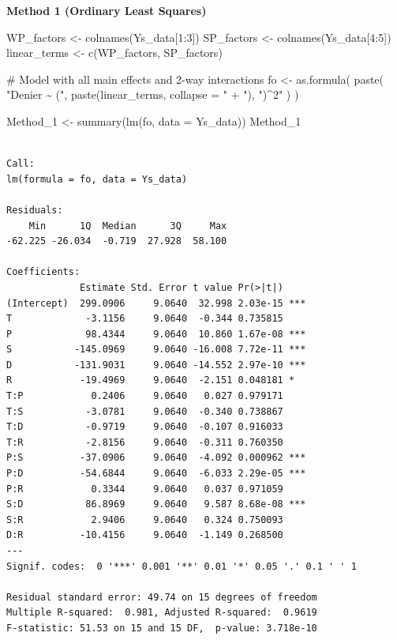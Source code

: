 \documentclass[
  letterpaper,
  DIV=11,
  numbers=noendperiod]{scrartcl}
\newenvironment{Shaded}{\begin{snugshade}}{\end{snugshade}}
\newcommand{\AttributeTok}[1]{\textcolor[rgb]{0.40,0.45,0.13}{#1}}
\newcommand{\CommentTok}[1]{\textcolor[rgb]{0.37,0.37,0.37}{#1}}
\newcommand{\DecValTok}[1]{\textcolor[rgb]{0.68,0.00,0.00}{#1}}
\newcommand{\FunctionTok}[1]{\textcolor[rgb]{0.28,0.35,0.67}{#1}}
\newcommand{\NormalTok}[1]{\textcolor[rgb]{0.00,0.23,0.31}{#1}}
\newcommand{\OtherTok}[1]{\textcolor[rgb]{0.00,0.23,0.31}{#1}}
\newcommand{\SpecialCharTok}[1]{\textcolor[rgb]{0.37,0.37,0.37}{#1}}
\newcommand{\StringTok}[1]{\textcolor[rgb]{0.13,0.47,0.30}{#1}}
\begin{document}
\textbf{Method 1 (Ordinary Least Squares)}

\begin{Shaded}
\begin{Highlighting}[]
\NormalTok{WP\_factors }\OtherTok{\textless{}{-}} \FunctionTok{colnames}\NormalTok{(Ys\_data[}\DecValTok{1}\SpecialCharTok{:}\DecValTok{3}\NormalTok{])}
\NormalTok{SP\_factors }\OtherTok{\textless{}{-}} \FunctionTok{colnames}\NormalTok{(Ys\_data[}\DecValTok{4}\SpecialCharTok{:}\DecValTok{5}\NormalTok{])}
\NormalTok{linear\_terms }\OtherTok{\textless{}{-}} \FunctionTok{c}\NormalTok{(WP\_factors, SP\_factors)}

\CommentTok{\# Model with all main effects and 2{-}way interactions}
\NormalTok{fo }\OtherTok{\textless{}{-}} \FunctionTok{as.formula}\NormalTok{(}
  \FunctionTok{paste}\NormalTok{(}
    \StringTok{"Denier \textasciitilde{} ("}\NormalTok{, }
    \FunctionTok{paste}\NormalTok{(linear\_terms, }\AttributeTok{collapse =} \StringTok{" + "}\NormalTok{), }
    \StringTok{")\^{}2"}
\NormalTok{  )}
\NormalTok{)}

\NormalTok{Method\_1 }\OtherTok{\textless{}{-}} \FunctionTok{summary}\NormalTok{(}\FunctionTok{lm}\NormalTok{(fo, }\AttributeTok{data =}\NormalTok{ Ys\_data))}
\NormalTok{Method\_1}
\end{Highlighting}
\end{Shaded}

\begin{verbatim}

Call:
lm(formula = fo, data = Ys_data)

Residuals:
    Min      1Q  Median      3Q     Max 
-62.225 -26.034  -0.719  27.928  58.100 

Coefficients:
             Estimate Std. Error t value Pr(>|t|)    
(Intercept)  299.0906     9.0640  32.998 2.03e-15 ***
T             -3.1156     9.0640  -0.344 0.735815    
P             98.4344     9.0640  10.860 1.67e-08 ***
S           -145.0969     9.0640 -16.008 7.72e-11 ***
D           -131.9031     9.0640 -14.552 2.97e-10 ***
R            -19.4969     9.0640  -2.151 0.048181 *  
T:P            0.2406     9.0640   0.027 0.979171    
T:S           -3.0781     9.0640  -0.340 0.738867    
T:D           -0.9719     9.0640  -0.107 0.916033    
T:R           -2.8156     9.0640  -0.311 0.760350    
P:S          -37.0906     9.0640  -4.092 0.000962 ***
P:D          -54.6844     9.0640  -6.033 2.29e-05 ***
P:R            0.3344     9.0640   0.037 0.971059    
S:D           86.8969     9.0640   9.587 8.68e-08 ***
S:R            2.9406     9.0640   0.324 0.750093    
D:R          -10.4156     9.0640  -1.149 0.268500    
---
Signif. codes:  0 '***' 0.001 '**' 0.01 '*' 0.05 '.' 0.1 ' ' 1

Residual standard error: 49.74 on 15 degrees of freedom
Multiple R-squared:  0.981, Adjusted R-squared:  0.9619 
F-statistic: 51.53 on 15 and 15 DF,  p-value: 3.718e-10
\end{verbatim}
\end{document}
